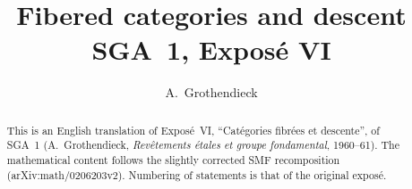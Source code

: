 \documentclass[11pt,a4paper]{amsart}
\title[SGA~1, Expos\'e VI (English)]{Fibered categories and descent\\
{\normalsize SGA~1, Expos\'e VI}}
\author{A.\ Grothendieck}
\date{}
\theoremstyle{plain}
\theoremstyle{definition}
\theoremstyle{remark}
\numberwithin{equation}{section}
\begin{document}
\begin{abstract}
This is an English translation of Expos\'e~VI,
``Cat\'egories fibr\'ees et descente'', of SGA~1
(A.\ Grothendieck, \textit{Rev\^etements \'etales et groupe fondamental},
1960--61). The mathematical content follows the slightly corrected SMF
recomposition (arXiv:math/0206203v2). Numbering of statements is that
of the original expos\'e.
\end{abstract}
\maketitle
\tableofcontents
\newpage





\end{document}
